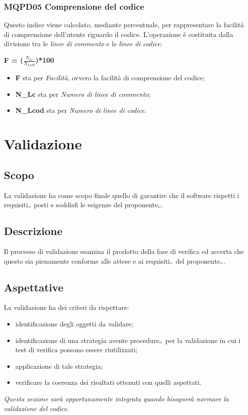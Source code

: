 \subsubsection{MQPD05 Comprensione del codice}\label{ProcessiDiSupportoVerificaMetricheMQPD05CompresioneDelCodice}
Questo indice viene calcolato, mediante percentuale, per rappresentare la facilità di comprensione dell'utente riguardo il codice.
L'operazione è costituita dalla divisione tra le \textit{linee di commento} e le \textit{linee di codice}:
\begin{center}
	\textbf{F = ($\frac{N_{Lc}}{N_{Lcod}}$)*100}
\end{center}
\begin{itemize}
	\item \textbf{F} sta per \textit{Facilità}, ovvero la facilità di comprensione del codice;
	\item \textbf{N\_Lc} sta per \textit{Numero di linee di commento};
	\item \textbf{N\_Lcod} sta per \textit{Numero di linee di codice}.
\end{itemize}

\section{Validazione} \label{ProcessiDiSupportoValidazione}
\subsection{Scopo} \label{ProcessiDiSupportoValidazioneScopo}
La validazione ha come scopo finale quello di garantire che il software rispetti i requisiti$_{\scaleto{G}{3pt}}$ posti e soddisfi le esigenze del proponente$_{\scaleto{G}{3pt}}$.
\subsection{Descrizione} \label{ProcessiDiSupportoValidazioneDescrizione}
Il processo di validazione esamina il prodotto della fase di verifica ed accerta che questo sia pienamente conforme alle attese e ai requisiti$_{\scaleto{G}{3pt}}$ del proponente$_{\scaleto{G}{3pt}}$.
\subsection{Aspettative} \label{ProcessiDiSupportoValidazioneAspettative}
La validazione ha dei criteri da rispettare:
\begin{itemize}
	\item identificazione degli oggetti da validare;
	\item identificazione di una strategia avente procedure$_{\scaleto{G}{3pt}}$ per la validazione in cui i test di verifica possono essere riutilizzati;
	\item applicazione di tale strategia;
	\item verificare la coerenza dei risultati ottenuti con quelli aspettati.
\end{itemize}
\textit{Questa sezione sarà opportunamente integrata quando bisognerà normare la validazione del codice.}
